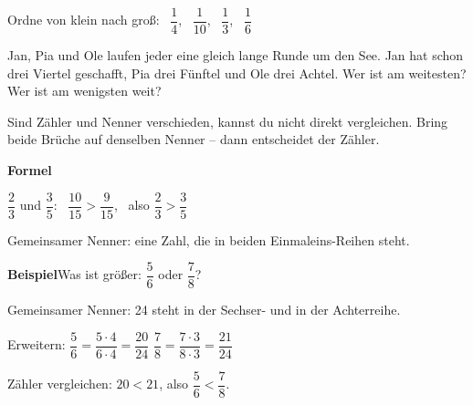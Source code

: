 \documentclass[11pt]{article}
\makeatletter
\newcommand{\aufg}[3]{\par\noindent\makebox[0pt][r]{#3}\begin{minipage}[t]{\linewidth}#1\end{minipage}\par}
\newcommand{\nr}[1]{\makebox[7mm][l]{\textbf{#1}}}
\newlength{\kr}
\newcommand{\karomerk}[2]{\protected@write\@auxout{}{\string\karoseite{#1}{#2}{\thepage}}}
\newcommand{\karoseite}[3]{\expandafter\xdef\csname karo@#1@#2\endcsname{#3}}
\makeatother
\begin{document}
\medskip
\aufg{\nr{3.}Ordne von klein nach groß: \ $\dfrac{1}{4}$, \ $\dfrac{1}{10}$, \ $\dfrac{1}{3}$, \ $\dfrac{1}{6}$}{}{}
\medskip
\aufg{\nr{4.}Jan, Pia und Ole laufen jeder eine gleich lange Runde um den See. Jan hat schon drei Viertel geschafft, Pia drei Fünftel und Ole drei Achtel. Wer ist am weitesten? Wer ist am wenigsten weit?}{}{{\scriptsize\color{mbgrau}Ziel\hspace{2mm}}}
\medskip
\par\vspace{3mm}\setlength{\kr}{\dimexpr\pagegoal-\pagetotal-10mm\relax}%
\ifdim\kr>12mm\karomerk{k}{A}\noindent{\scriptsize\color{mbgrau}Platz zum Rechnen}\par\nointerlineskip\vspace{1mm}\noindent
\begin{tikzpicture}\clip (0,0) rectangle ({\linewidth-0.5mm},\kr);\draw[black!16,line width=0.3pt,step=5mm] (0,0) grid (\linewidth,\kr);\end{tikzpicture}\fi\par
\clearpage\label{s:B}\noindent\colorbox{black!12}{}\hspace{3mm}{\Large\bfseries Gleichnamig machen, dann vergleichen}\par\smallskip
\noindent Sind Zähler und Nenner verschieden, kannst du nicht direkt vergleichen. Bring beide Brüche auf denselben Nenner – dann entscheidet der Zähler.\par\medskip
\noindent\textbf{Formel}\par\nopagebreak\noindent\hspace*{4mm}\begin{minipage}{\dimexpr\linewidth-4mm\relax}$\dfrac{2}{3}$ und $\dfrac{3}{5}$: \ $\dfrac{10}{15} > \dfrac{9}{15}$, \ also $\dfrac{2}{3} > \dfrac{3}{5}$ \par\vspace{4pt} {\small Gemeinsamer Nenner: eine Zahl, die in beiden Einmaleins-Reihen steht.}\end{minipage}\par\medskip
\noindent\textbf{Beispiel}\quad Was ist größer: $\dfrac{5}{6}$ oder $\dfrac{7}{8}$?\par\smallskip
\noindent\par\noindent{}Gemeinsamer Nenner: 24 steht in der Sechser- und in der Achterreihe.\par\smallskip\par\noindent{}Erweitern: $\dfrac{5}{6} = \dfrac{5 \cdot 4}{6 \cdot 4} = \dfrac{20}{24}$ \quad $\dfrac{7}{8} = \dfrac{7 \cdot 3}{8 \cdot 3} = \dfrac{21}{24}$\par\smallskip\par\noindent{}Zähler vergleichen: $20 < 21$, also $\dfrac{5}{6} < \dfrac{7}{8}$.\par\smallskip\par\medskip
\end{document}
